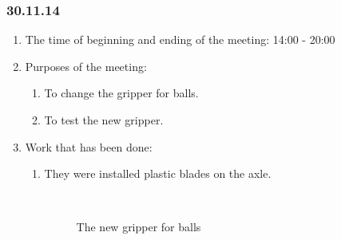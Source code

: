 \subsubsection{30.11.14}

\begin{enumerate}
	\item The time of beginning and ending of the meeting:
	14:00 - 20:00
	\item Purposes of the meeting:
	\begin{enumerate}
		\item To change the gripper for balls.
		
		\item To test the new gripper.
		
	\end{enumerate}
	\item Work that has been done:
	\begin{enumerate}
		\item They were installed plastic blades on the axle.
		
		\begin{figure}[H]
			\begin{minipage}[h]{0.2\linewidth}
				\center  
			\end{minipage}
			\begin{minipage}[h]{0.6\linewidth}
				\caption{The new gripper for balls}
			\end{minipage}
		\end{figure}
		

\end{enumerate}
\end{enumerate}

